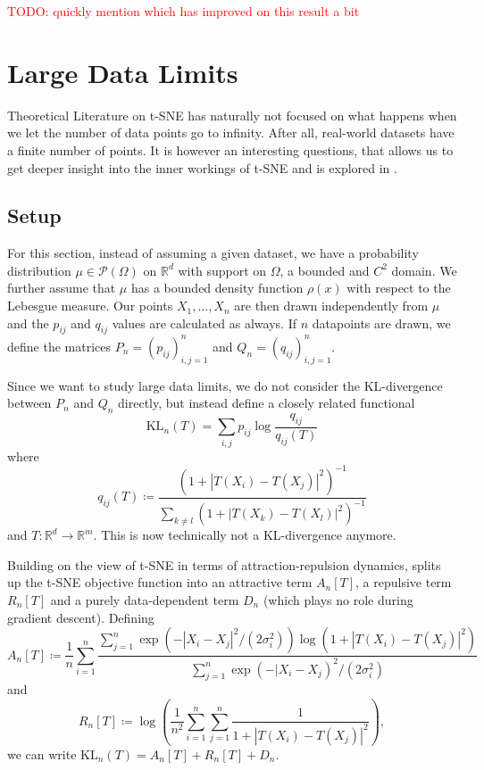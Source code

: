\textcolor{red}{TODO: quickly mention \cite{Arora18} which has improved on this result a bit}

\section{Large Data Limits}
Theoretical Literature on t-SNE has naturally not focused on what happens when we let the number of data points go to infinity. After all, real-world datasets have a finite number of points. It is however an interesting questions, that allows us to get deeper insight into the inner workings of t-SNE and is explored in \cite{murray2024largedatalimitsscaling}. 

\subsection*{Setup}
For this section, instead of assuming a given dataset, we have a probability distribution $\mu \in \mathcal{P}(\Omega)$ on $\mathbb{R}^d$ with support on $\Omega$, a bounded and $C^2$ domain. 
We further assume that $\mu$ has a bounded density function $\rho(x)$ with respect to the Lebesgue measure. 
Our points $X_1, \dots, X_n$ are then drawn independently from $\mu$ and the $p_{ij}$ and $q_{ij}$ values are calculated as always. 
If $n$ datapoints are drawn, we define the matrices $P_n = (p_{ij})_{i,j=1}^n$ and $Q_n = (q_{ij})_{i,j=1}^n$. 

Since we want to study large data limits, we do not consider the KL-divergence between $P_n$ and $Q_n$ directly, but instead define a closely related functional 
\begin{equation}
    \text{KL}_n (T) = \sum_{i,j} p_{ij} \log \frac{q_{ij}}{q_{ij}(T)}
\end{equation}
where 
\begin{equation}
    q_{ij}(T) \coloneq \frac{(1+ |T(X_i) - T(X_j)|^2)^{-1}}{\sum_{k \neq l} (1+ |T(X_k) - T(X_l)|^2)^{-1}}
\end{equation}
and $T: \mathbb{R}^d \to \mathbb{R}^m$. This is now technically not a KL-divergence anymore. 

Building on the view of t-SNE in terms of attraction-repulsion dynamics, \cite{murray2024largedatalimitsscaling} splits up the t-SNE objective function into an attractive term $A_n[T]$, a repulsive term $R_n[T]$ and a purely data-dependent term  $D_n$ (which plays no role during gradient descent). Defining 
\begin{equation}
    A_n[T] \coloneq \frac{1}{n} \sum_{i=1}^n \frac{\sum_{j=1}^n \exp(-|X_i - X_j|^2/(2\sigma_i^2)) \log(1+ |T(X_i) - T(X_j)|^2)}{\sum_{j=1}^n \exp(-|X_i - X_j)^2 / (2\sigma_i^2)}
\end{equation}
and 
\begin{equation}
    R_n[T] \coloneq \log \left( \frac{1}{n^2} \sum_{i=1}^n \sum_{j=1}^n \frac{1}{1+ |T(X_i) - T(X_j)|^2} \right), 
\end{equation}
we can write $\text{KL}_n (T) = A_n[T] + R_n[T] + D_n$. 

